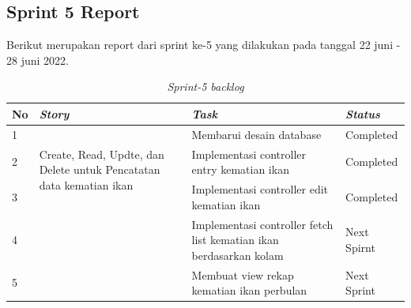 
\subsection{Sprint 5 Report}
Berikut merupakan report dari sprint ke-5 yang dilakukan pada tanggal 22 juni - 28 juni 2022.

\begin{table}[H]
	\caption{\textit{Sprint-5 backlog}}
	\label{sprint5_backlog}
	\begin{tabular}{@{} |p{0.5cm}|p{5cm}|p{5cm}|p{2cm}| @{}}
		\hline
		\textbf{No} & \textbf{\textit{Story}} & \textbf{\textit{Task}} & \textbf{\textit{Status}} \\
		\hline
		1 & \multirow{3}{5cm}{Create, Read, Updte, dan Delete untuk Pencatatan data kematian ikan} & Membarui desain database  & Completed\\
		\cline{1-1}\cline{3-4}
		2 & & Implementasi controller entry kematian ikan & Completed\\
		\cline{1-1}\cline{3-4}
		3 & & Implementasi controller edit kematian ikan & Completed\\
		\cline{1-1}\cline{3-4}
		4 & & Implementasi controller fetch list kematian ikan berdasarkan kolam & Next Spirnt\\
		\cline{1-1}\cline{3-4}
		5 & & Membuat view rekap kematian ikan perbulan & Next Sprint\\
		\cline{1-1}\cline{3-4}
		\hline
	\end{tabular}
\end{table}

